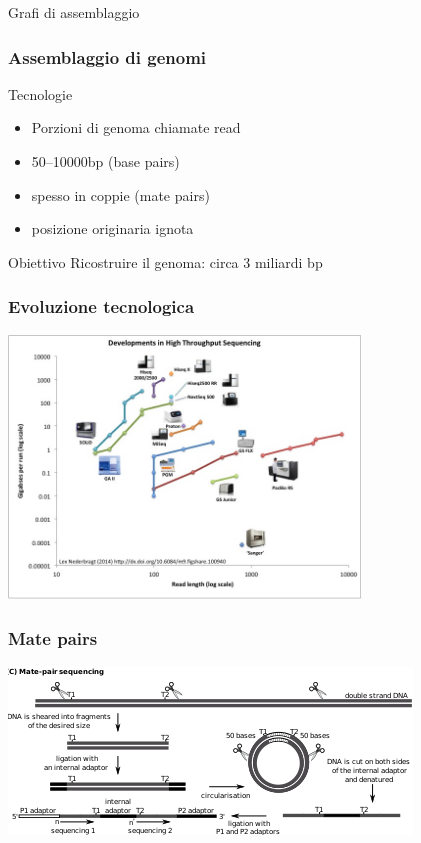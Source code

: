 \begin{frame}
      \titlepage

        \centering
          Grafi di assemblaggio
\end{frame}


\begin{frame}[fragile]
\frametitle{Assemblaggio di genomi}
\begin{block}{Tecnologie}
\begin{itemize}
\item
Porzioni di genoma chiamate \alert{read}
\item
50--10000bp (base pairs)
\item
spesso in coppie (\alert{mate pairs})
\item
posizione originaria ignota
\end{itemize}
\end{block}

\begin{block}{Obiettivo}
Ricostruire il genoma: circa 3 miliardi bp
\end{block}
\end{frame}

\begin{frame}[fragile]
\frametitle{Evoluzione tecnologica}
\includegraphics[width=0.7\textwidth]{figures/Developments_in_next_generation_sequencing.jpg}
\end{frame}

\begin{frame}[fragile]
\frametitle{Mate pairs}
\includegraphics[width=\textwidth]{figures/mate-pairs-solid}
\end{frame}

